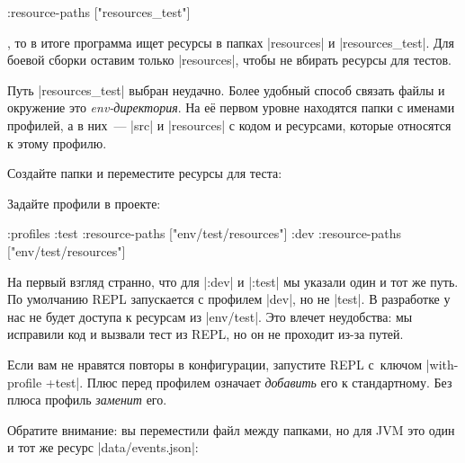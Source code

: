 \begin{english}
  \begin{clojure}
:resource-paths ["resources_test"]
  \end{clojure}
\end{english}

\noindent
, то в итоге программа ищет ресурсы в папках \spverb|resources| и
\spverb|resources_test|. Для боевой сборки оставим только \spverb|resources|,
чтобы не вбирать ресурсы для тестов.


Путь \spverb|resources_test| выбран неудачно. Более удобный способ связать файлы
и окружение это \emph{env-директория}. На её первом уровне находятся папки с
именами профилей, а в них~--- \spverb|src| и \spverb|resources| с кодом и
ресурсами, которые относятся к этому профилю.

Создайте папки и переместите ресурсы для теста:

\begin{english}
\end{english}

\noindent
Задайте профили в проекте:

\begin{english}
  \begin{clojure}
:profiles {:test {:resource-paths ["env/test/resources"]}
           :dev  {:resource-paths ["env/test/resources"]}}
  \end{clojure}
\end{english}

На первый взгляд странно, что для \spverb|:dev| и \spverb|:test| мы указали один
и тот же путь. По умолчанию REPL запускается с профилем \spverb|dev|, но не
\spverb|test|. В разработке у нас не будет доступа к ресурсам из
\spverb|env/test|. Это влечет неудобства: мы исправили код и вызвали тест из
REPL, но он не проходит из-за путей.


Если вам не нравятся повторы в конфигурации, запустите REPL с~ключом
\spverb|with-profile +test|. Плюс перед профилем означает \emph{добавить} его к
стандартному. Без плюса профиль \emph{заменит} его.


Обратите внимание: вы переместили файл между папками, но для JVM это один и тот
же ресурс \spverb|data/events.json|:

